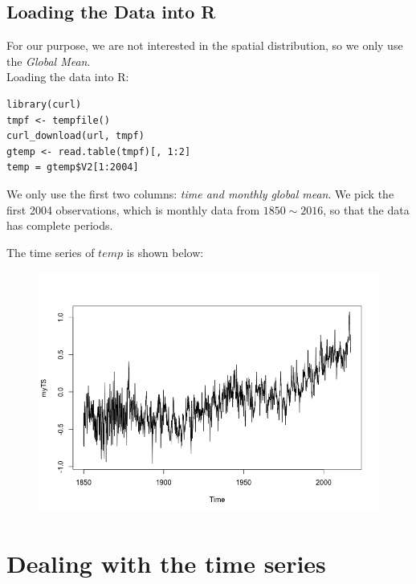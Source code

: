 \documentclass[a4paper, 11pt]{article}
\begin{document}
\subsection{Loading the Data into R}
For our purpose, we are not interested in the spatial distribution, so we only use the \textit{Global Mean}.\\
Loading the data into R:
\begin{verbatim}
library(curl)
tmpf <- tempfile()
curl_download(url, tmpf)
gtemp <- read.table(tmpf)[, 1:2]
temp = gtemp$V2[1:2004]
\end{verbatim}
\indent We only use the first two columns: \textit{time and monthly global mean}. We pick the first 2004 observations, which is monthly data from $1850 \sim 2016$, so that the data has complete periods.\par
The time series of $temp$ is shown below:
\begin{figure}[H]
\centering
\includegraphics[scale=.45]{temp.png}
\end{figure}

\section{Dealing with the time series}
\end{document}
